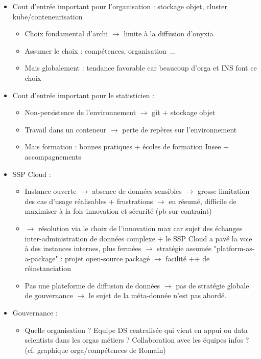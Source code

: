 \begin{itemize}
    \item Cout d'entrée important pour l'organisation : stockage objet, cluster kube/conteneurisation
    \begin{itemize}
        \item Choix fondamental d'archi $\rightarrow$ limite à la diffusion d'onyxia
        \item Assumer le choix : compétences, organisation~...
        \item Mais globalement : tendance favorable car beaucoup d'orga et INS font ce choix
    \end{itemize}
    \item Cout d'entrée important pour le statisticien :
    \begin{itemize}
        \item Non-persistence de l'environnement $\rightarrow$ git + stockage objet
        \item Travail dans un conteneur $\rightarrow$ perte de repères sur l'environnement
        \item Mais formation : bonnes pratiques + écoles de formation Insee + accompagnements
    \end{itemize}
    \item SSP Cloud :
    \begin{itemize}
        \item Instance ouverte $\rightarrow$ absence de données sensibles $\rightarrow$ grosse limitation des cas d'usage réalisables + frustrations $\rightarrow$ en résumé, difficile de maximiser à la fois innovation et sécurité (pb sur-contraint)
        \item $\rightarrow$ résolution via le choix de l'innovation max car sujet des échanges inter-administration de données complexe + le SSP Cloud a pavé la voie à des instances internes, plus fermées $\rightarrow$ stratégie assumée "platform-as-a-package" : projet open-source packagé $\rightarrow$ facilité ++ de réinstanciation
        \item Pas une plateforme de diffusion de données $\rightarrow$ pas de stratégie globale de gouvernance $\rightarrow$ le sujet de la méta-donnée n'est pas abordé.
    \end{itemize}
    \item Gouvernance :
    \begin{itemize}
        \item Quelle organisation ? Equipe DS centralisée qui vient en appui ou data scientists dans les orgas métiers ? Collaboration avec les équipes infos ? (cf. graphique orga/compétences de Romain)
    \end{itemize}
\end{itemize}
